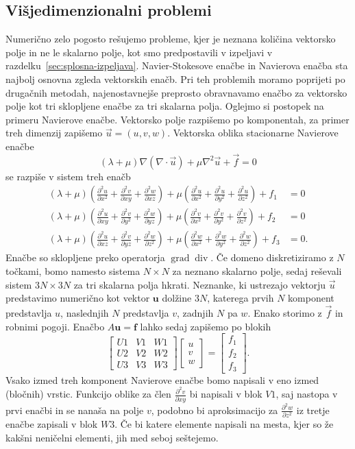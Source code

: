 \documentclass[a4paper,twoside]{article}
\theoremstyle{definition} %
\theoremstyle{plain} %
\numberwithin{equation}{section}
\renewcommand{\div}{\operatorname{div}}
\newcommand{\grad}{\operatorname{grad}}
\renewcommand{\b}{\boldsymbol}
\newcommand{\dpar}[2]{\ensuremath{\frac{\partial #1}{\partial #2}}}
\newcommand{\vu}{\vec{u}}
\newcommand{\vf}{\vec{f}}
\begin{document}
\subsection{Višjedimenzionalni problemi}
Numerično zelo pogosto rešujemo probleme, kjer je neznana količina vektorsko polje in
ne le skalarno polje, kot smo predpostavili v izpeljavi v
razdelku~\ref{sec:splosna-izpeljava}.  Navier-Stokesove enačbe in Navierova
enačba sta najbolj osnovna zgleda vektorskih enačb. Pri teh problemih moramo poprijeti
po drugačnih metodah, najenostavnejše preprosto obravnavamo enačbo za vektorsko polje
kot tri sklopljene enačbe za tri skalarna polja. Oglejmo si postopek na primeru Navierove
enačbe. Vektorsko polje razpišemo po komponentah, za primer treh dimenzij zapišemo
$\vu = (u, v, w)$. Vektorska oblika stacionarne Navierove enačbe
\[
  (\lambda+\mu)\nabla(\nabla\cdot \vu) + \mu\nabla^2 \vu + \vf = 0
\]
se razpiše v sistem treh enačb
\begin{align*}
(\lambda +\mu ) \left(\dpar{^2u}{x^2}+\dpar{^2v}{xy}+\dpar{^2w}{xz}\right)+\mu  \left(\dpar{^2u}{x^2}+\dpar{^2u}{y^2}+\dpar{^2u}{z^2}\right)+f_1&=0 \\
(\lambda +\mu ) \left(\dpar{^2u}{xy}+\dpar{^2v}{y^2}+\dpar{^2w}{yz}\right)+\mu  \left(\dpar{^2v}{x^2}+\dpar{^2v}{y^2}+\dpar{^2v}{z^2}\right)+f_2&=0 \\
(\lambda +\mu ) \left(\dpar{^2u}{xz}+\dpar{^2v}{yz}+\dpar{^2w}{z^2}\right)+\mu  \left(\dpar{^2w}{x^2}+\dpar{^2w}{y^2}+\dpar{^2w}{z^2}\right)+f_3&=0.
\end{align*}
Enačbe so sklopljene preko operatorja $\grad\div$. Če domeno diskretiziramo z $N$ točkami, bomo
namesto sistema $N\times N$ za neznano skalarno polje, sedaj reševali sistem $3N\times 3N$ za
tri skalarna polja hkrati. Neznanke, ki ustrezajo vektorju $\vu$ predstavimo numerično kot vektor
$\b{u}$ dolžine $3N$, katerega prvih $N$ komponent predstavlja $u$, naslednjih $N$ predstavlja $v$,
zadnjih $N$ pa $w$. Enako storimo z $\vf$ in robnimi pogoji. Enačbo $A\b u = \b f$ lahko sedaj
zapišemo po blokih
\[
  \begin{bmatrix}
    U1 & V1 & W1 \\
    U2 & V2 & W2 \\
    U3 & V3 & W3
  \end{bmatrix}
  \begin{bmatrix}
    u \\ v \\ w
  \end{bmatrix}
  =
  \begin{bmatrix}
    f_1 \\ f_2 \\ f_3
  \end{bmatrix}.
\]
Vsako izmed treh komponent Navierove enačbe bomo napisali v eno izmed (bločnih) vrstic. Funkcijo
oblike za člen $\dpar{^2v}{xy}$ bi napisali v blok $V1$, saj nastopa v prvi enačbi in se nanaša na
polje $v$, podobno bi aproksimacijo za $\dpar{^2w}{z^2}$ iz tretje enačbe zapisali v blok $W3$.
Če bi katere elemente napisali na mesta, kjer so že kakšni neničelni elementi, jih med seboj
seštejemo.
\end{document}
